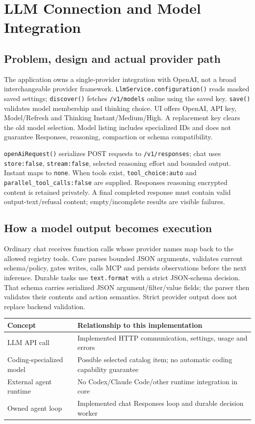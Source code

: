 \chapter{LLM Connection and Model Integration}
\section{Problem, design and actual provider path}
The application owns a single-provider integration with OpenAI, not a broad interchangeable provider framework. \texttt{LlmService.configuration()} reads masked saved settings; \texttt{discover()} fetches \texttt{/v1/models} online using the saved key. \texttt{save()} validates model membership and thinking choice. UI offers OpenAI, API key, Model/Refresh and Thinking Instant/Medium/High. A replacement key clears the old model selection. Model listing includes specialized IDs and does not guarantee Responses, reasoning, compaction or schema compatibility.

\texttt{openAiRequest()} serializes POST requests to \texttt{/v1/responses}; chat uses \texttt{store:false}, \texttt{stream:false}, selected reasoning effort and bounded output. Instant maps to \texttt{none}. When tools exist, \texttt{tool\_choice:auto} and \texttt{parallel\_tool\_calls:false} are supplied. Responses reasoning encrypted content is retained privately. A final completed response must contain valid output-text/refusal content; empty/incomplete results are visible failures.
\section{How a model output becomes execution}
Ordinary chat receives function calls whose provider names map back to the allowed registry tools. Core parses bounded JSON arguments, validates current schema/policy, gates writes, calls MCP and persists observations before the next inference. Durable tasks use \texttt{text.format} with a strict JSON-schema decision. That schema carries serialized JSON argument/filter/value fields; the parser then validates their contents and action semantics. Strict provider output does not replace backend validation.

\par\smallskip\noindent\begin{tabularx}{\linewidth}{@{}p{.29\linewidth}X@{}}\toprule
Concept & Relationship to this implementation\\\midrule
LLM API call & Implemented HTTP communication, settings, usage and errors\\
Coding-specialized model & Possible selected catalog item; no automatic coding capability guarantee\\
External agent runtime & No Codex/Claude Code/other runtime integration in core\\
Owned agent loop & Implemented chat Responses loop and durable decision worker\\\bottomrule
\end{tabularx}\par\smallskip
